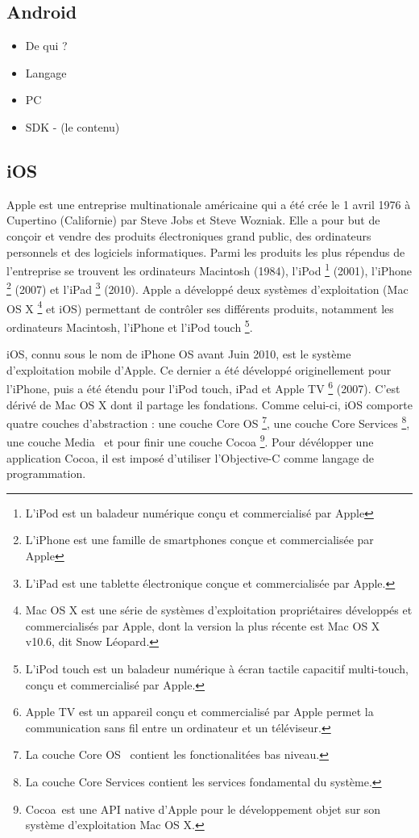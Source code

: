 \subsection{Android}
	\begin{itemize}
		\item{De qui ?}
		\item{Langage}
		\item{PC}
		\item{SDK - (le contenu)}
	\end{itemize}

\subsection{iOS}
	Apple est une entreprise multinationale américaine qui a été crée le 1 avril 1976 à Cupertino (Californie) par Steve Jobs et Steve Wozniak. Elle a pour but de conçoir et vendre des produits électroniques grand public, des ordinateurs personnels et des logiciels informatiques. Parmi les produits les plus répendus de l'entreprise se trouvent les ordinateurs Macintosh (1984), l'iPod \footnote{L'iPod est un baladeur numérique conçu et commercialisé par Apple} (2001), l'iPhone \footnote{L'iPhone est une famille de smartphones conçue et commercialisée par Apple}  (2007) et l'iPad \footnote{L'iPad est une tablette électronique conçue et commercialisée par Apple.} (2010). Apple a développé deux systèmes d'exploitation (Mac OS X \footnote{Mac OS X est une série de systèmes d’exploitation propriétaires développés et commercialisés par Apple, dont la version la plus récente est Mac OS X v10.6, dit Snow Léopard.} et iOS) permettant de contrôler ses différents produits, notamment les ordinateurs Macintosh, l'iPhone et l'iPod touch \footnote{L’iPod touch est un baladeur numérique à écran tactile capacitif multi-touch, conçu et commercialisé par Apple.}.
			
	iOS, connu sous le nom de iPhone OS avant Juin 2010, est le système d'exploitation mobile d'Apple. Ce dernier a été développé originellement pour l'iPhone, puis a été étendu pour l'iPod touch, iPad  et Apple TV \footnote{Apple TV est un appareil conçu et commercialisé par Apple permet la communication sans fil entre un ordinateur et un téléviseur.} (2007). C'est dérivé de Mac OS X  dont il partage les fondations. Comme celui-ci, iOS comporte quatre couches d'abstraction : une couche \og Core OS \fg \footnote{La couche \og Core OS \fg \,  contient les fonctionalitées bas niveau.}, une couche \og Core Services \fg \footnote{La couche \og Core Services \fg contient les services fondamental du système.}, une couche \og Media \fg \, et pour finir une couche \og Cocoa \fg \footnote{\og Cocoa \fg \,est une API native d'Apple pour le développement objet sur son système d'exploitation Mac OS X.}. Pour dévélopper une application Cocoa, il est imposé d'utiliser l'Objective-C comme langage de programmation.
			
